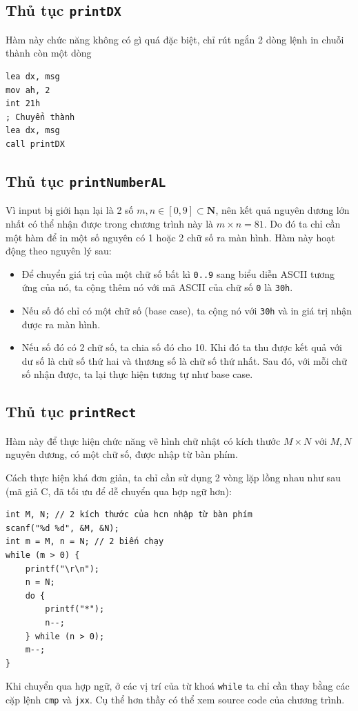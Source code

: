 \documentclass[12pt, final]{article}
\newcommand{\code}[1]{\texttt{#1}}
\begin{document}
\subsection{Thủ tục \texttt{printDX}}
Hàm này chức năng không có gì quá đặc biệt, chỉ rút ngắn 2 dòng lệnh in chuỗi thành còn một dòng
\begin{verbatim}
lea dx, msg
mov ah, 2
int 21h
; Chuyển thành
lea dx, msg
call printDX
\end{verbatim}

\subsection{Thủ tục \texttt{printNumberAL}}
Vì input bị giới hạn lại là 2 số $m, n \in [0, 9] \subset \mathbf{N}$, nên kết quả nguyên dương lớn nhất có thể nhận được trong chương trình này là $m\times n = 81$. Do đó ta chỉ cần một hàm để in một số nguyên có 1 hoặc 2 chữ số ra màn hình.
Hàm này hoạt động theo nguyên lý sau:
\begin{itemize}
    \item Để chuyển giá trị của một chữ số bất kì \code{0..9} sang biểu diễn ASCII tương ứng của nó, ta cộng thêm nó với mã ASCII của chữ số \texttt{0} là \texttt{30h}.
    \item Nếu số đó chỉ có một chữ số (base case), ta cộng nó với \texttt{30h} và in giá trị nhận được ra màn hình.
    \item Nếu số đó có 2 chữ số, ta chia số đó cho 10. Khi đó ta thu được kết quả với dư số là chữ số thứ hai và thương số là chữ số thứ nhất. Sau đó, với mỗi chữ số nhận được, ta lại thực hiện tương tự như base case.
\end{itemize}

\subsection{Thủ tục \texttt{printRect}}
Hàm này để thực hiện chức năng vẽ hình chữ nhật có kích thước $M\times N$ với $M, N$ nguyên dương, có một chữ số, được nhập từ bàn phím.

Cách thực hiện khá đơn giản, ta chỉ cần sử dụng 2 vòng lặp lồng nhau như sau (mã giả C, đã tối ưu để dễ chuyển qua hợp ngữ hơn):
\begin{verbatim}
int M, N; // 2 kích thước của hcn nhập từ bàn phím
scanf("%d %d", &M, &N);
int m = M, n = N; // 2 biến chạy
while (m > 0) {
    printf("\r\n");
    n = N;
    do {
        printf("*");
        n--;
    } while (n > 0);
    m--;
}
\end{verbatim}
Khi chuyển qua hợp ngữ, ở các vị trí của từ khoá \texttt{while} ta chỉ cần thay bằng các cặp lệnh \texttt{cmp} và \texttt{jxx}. Cụ thể hơn thầy có thể xem source code của chương trình.
\end{document}
